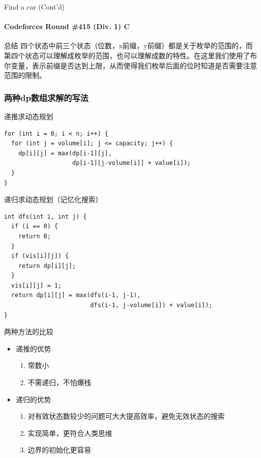 \documentclass[hyperref={unicode=true}]{beamer}
\theoremstyle{definition}
\theoremstyle{proof}
\begin{document}
\begin{frame}{Find a car (Cont'd)}\framesubtitle{Codeforces Round \#415 (Div. 1) C}
  \begin{exampleblock}{总结}
    四个状态中前三个状态（位数，x前缀，y前缀）都是关于枚举的范围的，而第四个状态可以理解成枚举的范围，也可以理解成数的特性。在这里我们使用了布尔变量，表示前缀是否达到上限，从而使得我们枚举后面的位时知道是否需要注意范围的限制。
  \end{exampleblock}
\end{frame}

\subsubsection{两种dp数组求解的写法}
\begin{frame}[fragile]{递推求动态规划}
  \begin{verbatim}
for (int i = 0; i < n; i++) {
  for (int j = volume[i]; j <= capacity; j++) {
    dp[i][j] = max(dp[i-1][j],
                   dp[i-1][j-volume[i]] + value[i]);
  }
}
  \end{verbatim}
\end{frame}

\begin{frame}[fragile]{递归求动态规划（记忆化搜索）}
  \begin{verbatim}
int dfs(int i, int j) {
  if (i == 0) {
    return 0;
  }
  if (vis[i][j]) {
    return dp[i][j];
  }
  vis[i][j] = 1;
  return dp[i][j] = max(dfs(i-1, j-1),
                        dfs(i-1, j-volume[i]) + value[i]);
}
  \end{verbatim}
\end{frame}
\begin{frame}{两种方法的比较}
  \begin{itemize}[<+->]
  \item 递推的优势
    \begin{enumerate}
    \item 常数小
    \item 不需递归，不怕爆栈
    \end{enumerate}
  \item 递归的优势
    \begin{enumerate}
    \item 对有效状态数较少的问题可大大提高效率，避免无效状态的搜索
    \item 实现简单，更符合人类思维
    \item 边界的初始化更容易
    \end{enumerate}
  \end{itemize}
\end{frame}
\end{document}

